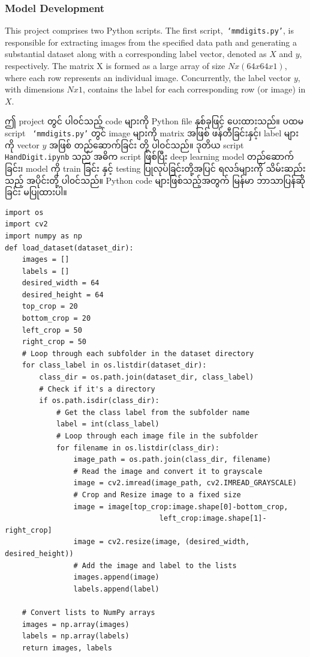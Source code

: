 \subsubsection{Model Development}
This project comprises two Python scripts. The first script,\texttt{ `mmdigits.py'}, is responsible for extracting images from the specified data path and generating a substantial dataset along with a corresponding label vector, denoted as $X$ and $y$, respectively. The matrix X is formed as a large array of size $N x (64 x 64 x 1)$, where each row represents an individual image. Concurrently, the label vector $y$, with dimensions $Nx1$, contains the label for each corresponding row (or image) in $X$.

ဤ project တွင် ပါ၀င်သည့် code များကို Python file နှစ်ခုဖြင့် ပေးထားသည်။ ပထမ script \texttt{ `mmdigits.py'} တွင်  image များကို matrix အဖြစ် ဖန်တီခြင်းနှင့်၊  label များကို vector $y$ အဖြစ် တည်ဆောက်ခြင်း တို့ ပါ၀င်သည်။ ဒုတိယ script \texttt{HandDigit.ipynb} သည် အဓိက script ဖြစ်ပြီး deep learning model တည်ဆောက်ခြင်း၊ model ကို train ခြင်း နှင့် testing ပြုလုပ်ခြင်းတို့အပြင် ရလဒ်များကို သိမ်းဆည်းသည့် အပိုင်းတို့ ပါ၀င်သည်။ Python code များဖြစ်သည့်အတွက် မြန်မာ ဘာသာပြန်ဆိုခြင်း မပြုထားပါ။ 

\begin{solution}
\begin{lstlisting}
import os
import cv2
import numpy as np
def load_dataset(dataset_dir):
    images = []
    labels = []
    desired_width = 64
    desired_height = 64
    top_crop = 20
    bottom_crop = 20
    left_crop = 50
    right_crop = 50    
    # Loop through each subfolder in the dataset directory
    for class_label in os.listdir(dataset_dir):
        class_dir = os.path.join(dataset_dir, class_label)          
        # Check if it's a directory
        if os.path.isdir(class_dir):
            # Get the class label from the subfolder name
            label = int(class_label)
            # Loop through each image file in the subfolder
            for filename in os.listdir(class_dir):
                image_path = os.path.join(class_dir, filename)     
                # Read the image and convert it to grayscale
                image = cv2.imread(image_path, cv2.IMREAD_GRAYSCALE)
                # Crop and Resize image to a fixed size 
                image = image[top_crop:image.shape[0]-bottom_crop, 
                                    left_crop:image.shape[1]-right_crop]
                image = cv2.resize(image, (desired_width, desired_height))                
                # Add the image and label to the lists
                images.append(image)
                labels.append(label)

    # Convert lists to NumPy arrays
    images = np.array(images)
    labels = np.array(labels)    
    return images, labels
\end{lstlisting}  
\end{solution}

